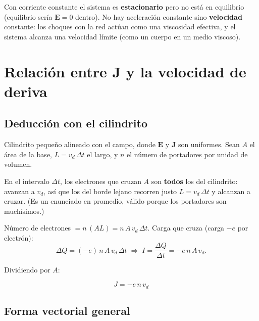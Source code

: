 \documentclass[12pt,a4paper]{article}
\begin{document}
\begin{notebox}
  Con corriente constante el sistema es \textbf{estacionario} pero no
  está en equilibrio (equilibrio sería $\mathbf{E}=0$ dentro). No hay
  aceleración constante sino \textbf{velocidad} constante: los choques
  con la red actúan como una viscosidad efectiva, y el sistema alcanza
  una velocidad límite (como un cuerpo en un medio viscoso).
\end{notebox}



\section{Relación entre J y la velocidad de deriva}

\subsection{Deducción con el cilindrito}

Cilindrito pequeño alineado con el campo, donde $\mathbf{E}$ y
$\mathbf{J}$ son uniformes. Sean $A$ el área de la base, $L = v_d\,\Delta
t$ el largo, y $n$ el número de portadores por unidad de volumen.

\begin{keybox}
  En el intervalo $\Delta t$, los electrones que cruzan $A$ son
  \textbf{todos} los del cilindrito: avanzan a $v_d$, así que los del
  borde lejano recorren justo $L=v_d\,\Delta t$ y alcanzan a cruzar. (Es
  un enunciado en promedio, válido porque los portadores son
  muchísimos.)
\end{keybox}

Número de electrones $=n\,(A L)=n\,A\,v_d\,\Delta t$. Carga que cruza
(carga $-e$ por electrón):
\[
\Delta Q = (-e)\, n\, A\, v_d\, \Delta t
\;\Longrightarrow\;
I = \frac{\Delta Q}{\Delta t} = -e\, n\, A\, v_d.
\]

Dividiendo por $A$:

\begin{keybox}
  \[
  \boxed{J = -e\, n\, v_d}
  \]
\end{keybox}



\subsection{Forma vectorial general}
\end{document}

